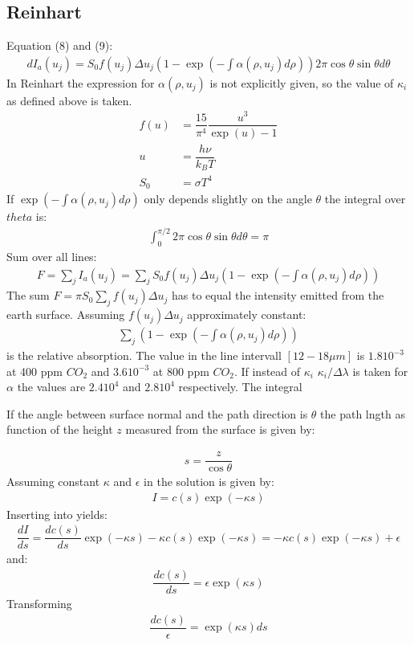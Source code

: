 
\subsection{Reinhart}

Equation (8) and (9):
\begin{align}
    dI_a(u_j) = S_0 f(u_j) \Delta u_j \left(1 - \exp\left(-\int \alpha(\rho, u_j) d \rho\right) \right) 2 \pi \cos \theta \sin \theta d \theta
\end{align}
In Reinhart the expression for $\alpha(\rho, u_j)$ is not explicitly given, so the value of $\kappa_i$ as defined above is taken.
\begin{align}
    f(u) &= \dfrac{15}{\pi^4} \dfrac{u^3}{\exp(u) - 1} \\
    u    &= \dfrac{h \nu}{k_B T} \\
    S_0  &= \sigma T^4
\end{align}
If $\exp\left(-\int \alpha(\rho, u_j) d \rho\right)$ only depends slightly on the angle $\theta$ the integral over $theta$ is:
\begin{align}
    \int_{0}^{\pi/2} 2 \pi \cos \theta \sin \theta d \theta = \pi
\end{align}
Sum over all lines:
\begin{align}
    F = \sum_j I_a(u_j) = \sum_j S_0 f(u_j) \Delta u_j \left(1 - \exp\left(-\int \alpha(\rho, u_j) d \rho\right) \right)
\end{align}
The sum $F =  \pi S_0 \sum_j f(u_j) \Delta u_j$ has to equal the intensity emitted from the earth surface.
Assuming $f(u_j) \Delta u_j$ approximately constant:
\begin{align}
    \sum_j \left(1 - \exp\left(-\int \alpha(\rho, u_j) d \rho\right) \right)
\end{align}
is the relative absorption. The value in the line intervall $[12-18 \mu m]$ is $1.8 10^{-3}$ at 400 ppm $CO_2$ and $3.6  10^{-3}$ at 800 ppm $CO_2$.
If instead of $\kappa_i$ $\kappa_i / \Delta \lambda$ is taken for $\alpha$ the values are $2.4 10^4$ and $2.8 10^4$ respectively.
The integral

If the angle between surface normal and the path direction is $\theta$ the path lngth as function of the height $z$ measured from 
the surface is given by:

\begin{align}
	s = \dfrac{z}{\cos\theta}
\end{align}
Assuming constant $\kappa$ and $\epsilon$ in  the solution is given by:
\begin{align}
	I = c(s) \exp( - \kappa s)
\end{align}
Inserting into  yields:
\begin{align}
		\dfrac{d I}{d s} = \dfrac{d c(s)}{ds } \exp( - \kappa s) - \kappa c(s) \exp( - \kappa s) = - \kappa c(s) \exp( - \kappa s) + \epsilon
\end{align}
and:
\begin{align}
	\dfrac{d c(s)}{ds}  = \epsilon \exp(\kappa s)
\end{align}
Transforming
\begin{align}
	\dfrac{d c(s)}{\epsilon}  =  \exp(\kappa s) ds
\end{align}

